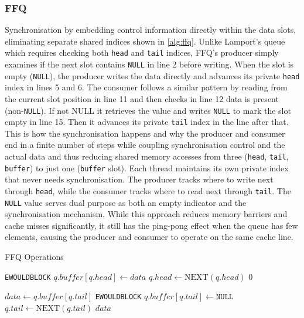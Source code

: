 \subsubsection{\acf{FFQ}}
Synchronisation by embedding control information directly within the data slots, eliminating separate shared indices shown in \cref{alg:ffq}. Unlike Lamport's queue which requires checking both \texttt{head} and \texttt{tail} indices, \ac{FFQ}'s producer simply examines if the next slot contains \texttt{NULL} in line 2 before writing. When the slot is empty (\texttt{NULL}), the producer writes the data directly and advances its private \texttt{head} index in lines 5 and 6. The consumer follows a similar pattern by reading from the current slot position in line 11 and then checks in line 12 data is present (non-\texttt{NULL}). If not NULL it retrieves the value and writes \texttt{NULL} to mark the slot empty in line 15. Then it advances its private \texttt{tail} index in the line after that. This is how the synchronisation happens and why the producer and consumer end in a finite number of steps while coupling synchronisation control and the actual data and thus reducing shared memory accesses from three (\texttt{head}, \texttt{tail}, \texttt{buffer}) to just one (\texttt{buffer} slot). Each thread maintains its own private index that never needs synchronisation. The producer tracks where to write next through \texttt{head}, while the consumer tracks where to read next through \texttt{tail}. The \texttt{NULL} value serves dual purpose as both an empty indicator and the synchronisation mechanism. While this approach reduces memory barriers and cache misses significantly, it still has the ping-pong effect when the queue has few elements, causing the producer and consumer to operate on the same cache line. \cite{ffq} 

\begin{algorithm}[!ht]
    \centering
    \captionsetup{justification=centering}
    \caption{\ac{FFQ} Operations \cite{ffq}}
    \label{alg:ffq}
    \scriptsize
    \begin{algorithmic}[1]
                \State \Return \texttt{EWOULDBLOCK}
            \EndIf
            \State $q.buffer[q.head] \gets data$
            \State $q.head \gets \text{NEXT}(q.head)$
            \State \Return $0$
        \EndFunction
        
        \State
        
            \State $data \gets q.buffer[q.tail]$
                \State \Return \texttt{EWOULDBLOCK}
            \EndIf
            \State $q.buffer[q.tail] \gets \texttt{NULL}$
            \State $q.tail \gets \text{NEXT}(q.tail)$
            \State \Return $data$
        \EndFunction
    \end{algorithmic}
\end{algorithm}

